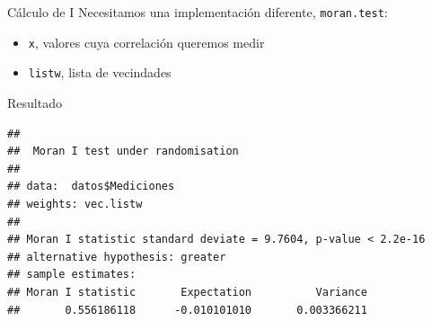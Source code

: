 \documentclass[
  11pt,
  ignorenonframetext,
]{beamer}
\newenvironment{Shaded}{}{}
\newcommand{\AttributeTok}[1]{\textcolor[rgb]{0.49,0.56,0.16}{#1}}
\newcommand{\FunctionTok}[1]{\textcolor[rgb]{0.02,0.16,0.49}{#1}}
\newcommand{\NormalTok}[1]{#1}
\newcommand{\OtherTok}[1]{\textcolor[rgb]{0.00,0.44,0.13}{#1}}
\newcommand{\SpecialCharTok}[1]{\textcolor[rgb]{0.25,0.44,0.63}{#1}}
\begin{document}
\begin{frame}[fragile]{Cálculo de I}
\protect\hypertarget{cuxe1lculo-de-i}{}
Necesitamos una implementación diferente, \texttt{moran.test}:

\begin{Shaded}
\end{Shaded}

\begin{itemize}
\item
  \texttt{x}, valores cuya correlación queremos medir
\item
  \texttt{listw}, lista de vecindades
\end{itemize}
\end{frame}

\begin{frame}[fragile]{Resultado}
\protect\hypertarget{resultado}{}
\begin{verbatim}
## 
##  Moran I test under randomisation
## 
## data:  datos$Mediciones  
## weights: vec.listw    
## 
## Moran I statistic standard deviate = 9.7604, p-value < 2.2e-16
## alternative hypothesis: greater
## sample estimates:
## Moran I statistic       Expectation          Variance 
##       0.556186118      -0.010101010       0.003366211
\end{verbatim}
\end{frame}
\end{document}

